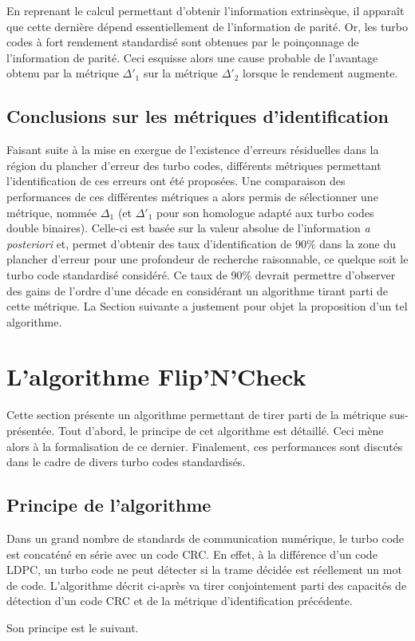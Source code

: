 En reprenant le calcul permettant d'obtenir l'information extrinsèque, il apparaît que cette dernière dépend essentiellement
de l'information de parité. Or, les turbo codes à fort rendement standardisé sont obtenues par le poinçonnage de l'information
de parité. Ceci esquisse alors une cause probable de l'avantage obtenu par la métrique $\Delta'_1$ sur la métrique $\Delta'_2$
lorsque le rendement augmente.

\subsection{Conclusions sur les métriques d'identification}
Faisant suite à la mise en exergue de l'existence d'erreurs résiduelles dans la région du plancher d'erreur des turbo codes,
différents métriques permettant l'identification de ces erreurs ont été proposées. Une comparaison des performances de ces 
différentes métriques a alors permis de sélectionner une métrique, nommée $\Delta_1$ (et $\Delta'_1$ pour son homologue 
adapté aux turbo codes double binaires). Celle-ci est basée sur la valeur absolue de l'information \textit{a posteriori}
et, permet d'obtenir des taux d'identification de 90\% dans la zone du plancher d'erreur pour une profondeur de recherche 
raisonnable, ce quelque soit le turbo code standardisé considéré. Ce taux de 90\% devrait permettre d'observer des gains 
de l'ordre d'une décade en considérant un algorithme tirant parti de cette métrique. La Section suivante a justement pour 
objet la proposition d'un tel algorithme.

\section{L'algorithme Flip'N'Check}
Cette section présente un algorithme permettant de tirer parti de la métrique sus-présentée. Tout d'abord, le 
principe de cet algorithme est détaillé. Ceci mène alors à la formalisation de ce dernier. Finalement, ces performances 
sont discutés dans le cadre de divers turbo codes standardisés.

\subsection{Principe de l'algorithme}
Dans un grand nombre de standards de communication numérique, le turbo code est concaténé en série avec un code CRC. En 
effet, à la différence d'un code LDPC, un turbo code ne peut détecter si la trame décidée est réellement un mot de code. 
L'algorithme  décrit ci-après va tirer conjointement parti des capacités de détection d'un code CRC et de la métrique 
d'identification précédente. 

Son principe est le suivant.


